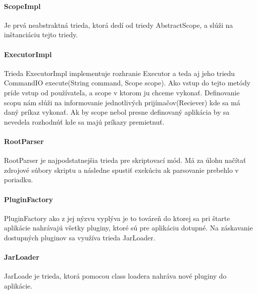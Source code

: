 \paragraph{ScopeImpl}
Je prvá neabstraktná trieda, ktorá dedí od triedy AbstractScope, a slúži na inštanciáciu tejto triedy. 
\paragraph{ExecutorImpl}
Trieda ExecutorImpl implementuje rozhranie Executor a teda aj jeho triedu CommandIO execute(String command, Scope scope). Ako vstup do tejto metódy príde vstup od používateľa, a scope v ktorom ju chceme vykonať. Definovanie scopu nám slúži na informovanie jednotlivých prijímačov(Reciever) kde sa má daný príkaz vykonať. Ak by scope nebol presne definovaný aplikácia by sa nevedela rozhodnúť kde sa majú príkazy premietnuť.
\paragraph{RootParser}
RootParser je najpodstatnejšia trieda pre skriptovací mód. Má za úlohu načítať zdrojové súbory skriptu a následne spustiť exekúciu ak parsovanie prebehlo v poriadku.
\paragraph{PluginFactory}
PluginFactory ako z jej nýzvu vyplýva je to továreň do ktorej sa pri štarte aplikácie nahrávajú všetky pluginy, ktoré sú pre aplikáciu dotupné. Na záskavanie dostupných pluginov sa využíva trieda JarLoader. 
\paragraph{JarLoader}
JarLoade je trieda, ktorá pomocou class loadera nahráva nové pluginy do aplikácie.
